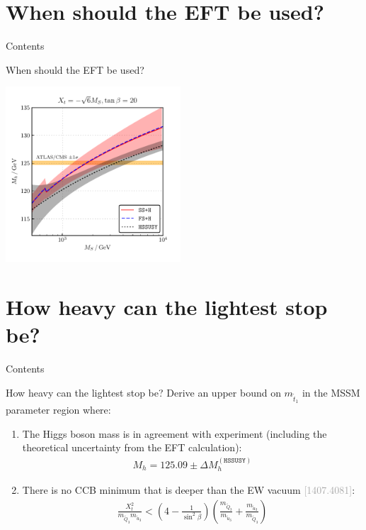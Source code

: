 \documentclass[hyperref={pdfpagelabels=false},ngerman]{beamer}
\newcommand{\bigcite}[1]{\textcolor{darkgray}{[#1]}}
\begin{document}
\section{When should the EFT be used?}

\begin{frame}{Contents}
  \tableofcontents[currentsection]
\end{frame}

\begin{frame}{When should the EFT be used?}
  \begin{center}
    \includegraphics[width=0.49\textwidth]{plots/kuts-9/Mh_MS_TB-20_Xt--sqrt6}
  \end{center}
\end{frame}

\section{How heavy can the lightest stop be?}

\begin{frame}{Contents}
  \tableofcontents[currentsection]
\end{frame}

\begin{frame}{How heavy can the lightest stop be?}
  Derive an upper bound on $m_{\tilde{t}_1}$ in the MSSM parameter
  region where:
  \begin{enumerate}
  \item The Higgs boson mass is in agreement with experiment
    (including the theoretical uncertainty from the EFT calculation):
    \begin{align*}
      M_h = 125.09 \pm \Delta M_h^{(\texttt{HSSUSY})}
    \end{align*}
  \item There is no CCB minimum that is deeper than the EW vacuum
    \bigcite{1407.4081}:
    \begin{align*}
      \frac{X_t^2}{m_{\tilde{Q}_3} m_{\tilde{u}_3}} < \left(4 - \frac{1}{\sin^2\beta}\right) \left(\frac{m_{\tilde{Q}_3}}{m_{\tilde{u}_3}} + \frac{m_{\tilde{u}_3}}{m_{\tilde{Q}_3}}\right)
    \end{align*}
  \end{enumerate}
\end{frame}
\end{document}
